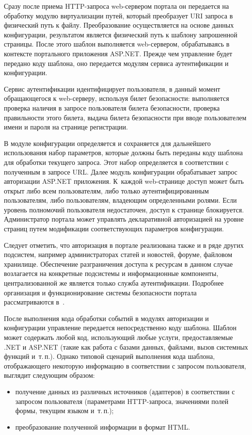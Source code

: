 \begin{multicols}{2}
 Сразу после приема HTTP-запроса web-сер\-ве\-ром портала он передается на
обработку модулю виртуализации путей, который преобразует URI запроса в физический
путь к файлу. Преобразование осуществляется на основе данных конфигурации,
результатом является физический путь к шаб\-ло\-ну запрошенной страницы. После этого
шаб\-лон выполняется web-сервером, обрабатываясь в контексте портального приложения
ASP.NET. Преж\-де чем управление будет передано коду шаблона, оно передается модулям
сервиса аутентификации и конфигурации.

 Сервис аутентификации идентифицирует пользователя, в данный момент
обращающегося к web-сер\-ве\-ру, используя билет безопасности: выполняется проверка
наличия в запросе пользователя билета безопасности, проверка правильности этого %
билета, выдача билета безопасности при вводе пользователем имени и пароля на странице
ре\-ги\-ст\-рации.
{

}

 В модуле конфигурации определяется и сохраняется для дальнейшего
использования набор параметров, которые должны быть переданы коду шаб\-ло\-на для
обработки текущего запроса. Этот набор определяется в соответствии с полученным в
запросе URL. Далее модуль конфигурации обрабатывает запрос авторизации ASP.NET
приложения. К~каж\-дой web-стра\-ни\-це доступ может быть открыт либо всем
пользователям, либо только аутентифицированным пользователям, либо пользователям,
вла\-деющим определенными ролями. Если уровень %
полномочий пользователя
недостаточен, доступ к странице блокируется. Администратор портала может управлять
декларативной авторизацией на уровне страниц путем модификации со\-от\-вет\-ст\-ву\-ющих
параметров конфигурации.

 Следует отметить, что авторизация в портале реализована также и в ряде других
подсистем, например администраторах статей и новостей, форуме, файловом хранилище.
Обеспечение разграничения доступа к ресурсам в данном случае возлагается на
конкретные подсистемы и информационные компоненты, централизованной же является
только служба аутентификации. Подробнее организация и функционирование системы
безопасности портала рассматриваются в~\cite{11bos}.

 После выполнения кода обработки событий в модулях авторизации и
конфигурации управление передается непосредственно коду шаблона. Шаб\-лон может
содержать любой код, использующий любые услуги, предоставляемые .NET и ASP.NET
(такие как работа с базами данных, файлами, вызов системных функций и~т.\,п.). Однако
типовой сценарий выполнения кода шаблона, отображающего некоторую информацию в
соответствии с запросом пользователя, выглядит следующим образом:
 \begin{itemize}
\item получение данных из различных источников (адаптеров) в соответствии с
запросом пользователя (параметрами HTTP-запроса, значениями полей формы,
текущим языком и~т.\,п.);
\item преобразование полученной информации в формат HTML.
\end{itemize}


\end{multicols}
